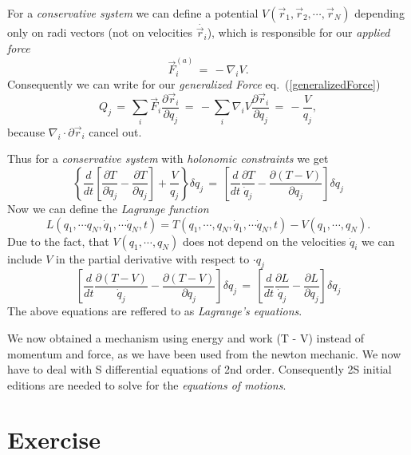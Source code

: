 For a \textit{conservative system} we can define a potential $V(\vec r_1, \vec
r_2, \cdots, \vec r_N)$ depending only on radi vectors (not on velocities
$\dot{\vec r_i}$), which is responsible for our \textit{applied force}
\begin{equation}
  \vec F_i^{(a)} \,=\, -\nabla_i V.
\end{equation}
Consequently we can write for our \textit{generalized Force}
eq.~(\ref{generalizedForce}) 
\begin{equation}
  Q_j \,=\, \sum_i \vec F_i \frac{\partial \vec r_i}{\partial q_j} \,=\,
- \sum_i \nabla_i V \frac{\partial \vec r_i}{\partial q_j} \,=\,
-\frac{V}{q_j}, 
\end{equation}
because $\nabla_i \cdot \partial \vec r_i$ cancel out.

Thus for a \textit{conservative system} with \textit{holonomic constraints} we
get
\begin{equation}
  \left\{ \frac{d}{dt} \left[\frac{\partial T}{\partial \dot q_j} - \frac{\partial
T}{\partial q_j} \right] + \frac{V}{q_j}\right\} \delta q_j \,=\, \left[
\frac{d}{dt} \frac{\partial T}{\dot q_j} - \frac{\partial (T - V)}{\partial
q_j} \right] \delta q_j 
\end{equation}
Now we can define the \textit{Lagrange function}
\begin{equation}
  L(q_1, \cdots q_N, \dot q_1, \cdots \dot q_N, t) = T(q_1, \cdots, q_N, \dot
q_1, \cdots \dot q_N, t) - V(q_1, \cdots, q_N).
\end{equation}
Due to the fact, that $V(q_1, \cdots, q_N)$ does not depend on the velocities $\dot
q_i$ we can include $V$ in the partial derivative with respect to $\cdot q_j$
\begin{equation}
\left[ \frac{d}{dt} \frac{\partial (T-V)}{\dot q_j} - \frac{\partial (T - V)}{\partial
q_j} \right] \delta q_j  \,=\, \left[ \frac{d}{dt} \frac{\partial L}{\dot q_j}
- \frac{\partial L}{\partial
q_j} \right] \delta q_j
\end{equation}
The above equations are reffered to as \textit{Lagrange's equations}.

We now obtained a mechanism using energy and work (T - V) instead of momentum
and force, as we have been used from the newton mechanic. We now have to deal
with S differential equations of 2nd order. Consequently 2S initial editions
are needed to solve for the \textit{equations of motions}.

\section{Exercise}

